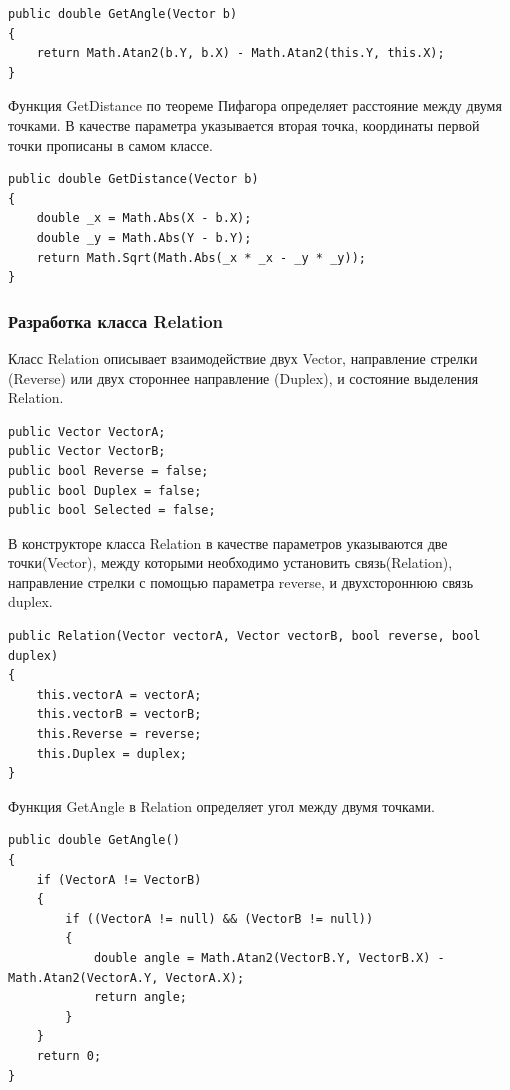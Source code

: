 \documentclass[a4paper,14pt, Times New Roman]{extarticle}
\begin{document}
\begin{lstlisting}
public double GetAngle(Vector b)
{
    return Math.Atan2(b.Y, b.X) - Math.Atan2(this.Y, this.X);
}
\end{lstlisting}

Функция GetDistance по теореме Пифагора определяет расстояние между двумя точками. В качестве параметра указывается вторая точка, координаты первой точки прописаны в самом классе.

\begin{lstlisting}
public double GetDistance(Vector b)
{
    double _x = Math.Abs(X - b.X);
    double _y = Math.Abs(Y - b.Y);
    return Math.Sqrt(Math.Abs(_x * _x - _y * _y));
}
\end{lstlisting}

\subsubsection{Разработка класса Relation}

Класс  Relation описывает взаимодействие двух Vector, направление стрелки (Reverse) или двух стороннее направление (Duplex), и состояние выделения Relation.

\begin{lstlisting}
public Vector VectorA;
public Vector VectorB;
public bool Reverse = false;
public bool Duplex = false;
public bool Selected = false;
\end{lstlisting}

В конструкторе класса Relation в качестве параметров указываются две точки(Vector), между которыми необходимо установить связь(Relation), направление стрелки с помощью параметра reverse, и  двухстороннюю связь duplex.

\begin{lstlisting}
public Relation(Vector vectorA, Vector vectorB, bool reverse, bool duplex)
{
    this.vectorA = vectorA;
    this.vectorB = vectorB;
    this.Reverse = reverse;
    this.Duplex = duplex;
}
\end{lstlisting}

Функция GetAngle в Relation определяет угол между двумя точками.

\begin{lstlisting}
public double GetAngle()
{
    if (VectorA != VectorB)
    {
        if ((VectorA != null) && (VectorB != null))
        {
            double angle = Math.Atan2(VectorB.Y, VectorB.X) - Math.Atan2(VectorA.Y, VectorA.X);
            return angle;
        }
    }
    return 0;
}
\end{lstlisting}
\end{document}
